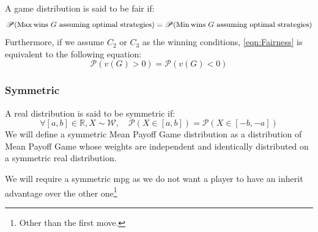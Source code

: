 A game distribution is said to be fair if:
\begin{equation}
	\label{eqn:Fairness}
	\mathscr{P}(\operatorname{Max} \text{wins}\ G \ \text{assuming optimal strategies} ) = 	\mathscr{P}(\operatorname{Min} \text{wins}\ G \ \text{assuming optimal strategies} )
\end{equation}
Furthermore, if we assume $C_2$ or $C_3$ as the winning conditions, \eqref{eqn:Fairness} is equivalent to the following equation:
\begin{equation*}
	\mathscr{P}(v(G) > 0) = \mathscr{P}(v(G) < 0)
\end{equation*}
\subsubsection{Symmetric}
A real distribution is said to be symmetric if:
$$
\forall [a,b]\in \mathbb{R},X\sim \mathcal{W},\quad \mathscr{P}(X\in [a,b]) = \mathscr{P}(X\in [-b,-a])
$$
We will define a symmetric Mean Payoff Game distribution as a distribution of Mean Payoff Game whose weights are independent and identically distributed on a symmetric real distribution.

We will require a symmetric \acrshort{mpg} as we do not want a player to have an inherit advantage over the other one\footnote{Other than the first move.}

